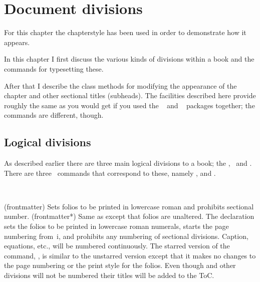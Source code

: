 \chapter{Document divisions}

For this chapter the  chapterstyle has been used in
order to demonstrate how it appears.


In this chapter I first discuss the various kinds of divisions within
a book and the commands for typesetting these.

After that I describe the class methods for modifying the appearance
of the chapter and other sectional titles (subheads).
The facilities described here provide roughly the same as you would
get if you used the ~\cite{TITLESEC} and
~\cite{SECTSTY} packages together; the commands are
different, though.

\section{Logical divisions}

    As described earlier there are three main logical divisions to a book;
the \pixfrontmatter, \pixmainmatter\ and \pixbackmatter. There are three \ltx\
commands that correspond to these, namely \cmd{\frontmatter},
\cmd{\mainmatter} and \cmd{\backmatter}.

\begin{syntax}
\cmd{\frontmatter} \cmd{\frontmatter*} \\
\end{syntax}
\glossary(frontmatter)%
  {}%
  {Sets folios to be printed in lowercase roman and prohibits sectional
   number.}
\glossary(frontmatter*)%
  {}%
  {Same as  except that folios are unaltered.}
The \cmd{\frontmatter} declaration sets the folios to be 
printed in lowercase roman numerals, starts the page numbering from~i, 
and prohibits any numbering
of sectional divisions. Caption, equations, etc., will be 
numbered continuously.  The starred version of the command,
\cmd{\frontmatter*}, is similar to the unstarred version except that it
makes no changes to the page numbering or the print style for the 
folios\index{folio}. Even though \cmd{\chapter} and other divisions will not
be numbered their titles will be added to the ToC.

